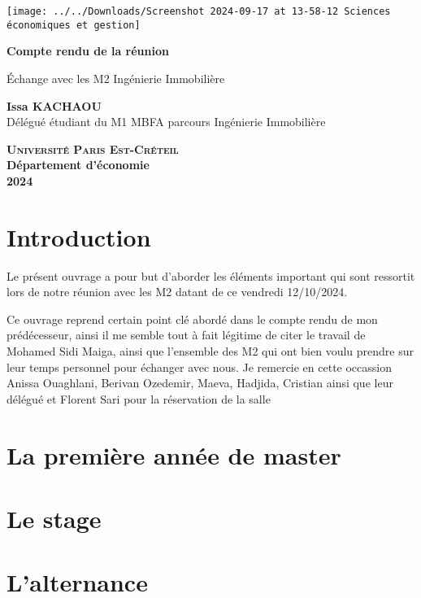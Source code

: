\documentclass[a4paper, 12pt]{report}
\begin{document}
	
\begin{titlepage}
	\centering
	\begin{center}
		\texttt{[image: ../../Downloads/Screenshot 2024-09-17 at 13-58-12 Sciences économiques et gestion]}
	\end{center}
	\vspace*{2cm}
	
	\Huge
	
	\textbf{Compte rendu de la réunion}
	\vspace{1.5cm}
	
	\Large
	Échange avec les M2 Ingénierie Immobilière
	
	\vspace{2cm}
	
	\textbf{Issa KACHAOU} \\
	{\normalsize Délégué étudiant du M1 MBFA parcours Ingénierie Immobilière}

	
	\vfill
	
	\Large

\textsc{\textbf{Université Paris Est-Créteil}}	 \\
	\textbf{Département d'économie} \\
	\textbf{2024}
	
\end{titlepage}
\thispagestyle{empty}
\newpage
\clearpage
\mbox{}
\thispagestyle{empty}

\tableofcontents

\thispagestyle{empty}
\newpage
\mbox{}
\thispagestyle{empty} %

\chapter{Introduction}

Le présent ouvrage a pour but d'aborder les éléments important qui sont ressortit lors de notre réunion avec les M2 datant de ce vendredi 12/10/2024. 
	
Ce ouvrage reprend certain point clé abordé dans le compte rendu de mon prédécesseur, ainsi il me semble tout à fait légitime de citer le travail de Mohamed Sidi Maiga, ainsi que l'ensemble des M2 qui ont bien voulu prendre sur leur temps personnel pour échanger avec nous. Je remercie en cette occassion Anissa Ouaghlani, Berivan Ozedemir, Maeva, Hadjida, Cristian ainsi que leur délégué et Florent Sari pour la réservation de la salle 

\chapter{La première année de master}



\chapter{Le stage}
	
	
	
\chapter{L'alternance}
	
\end{document}
